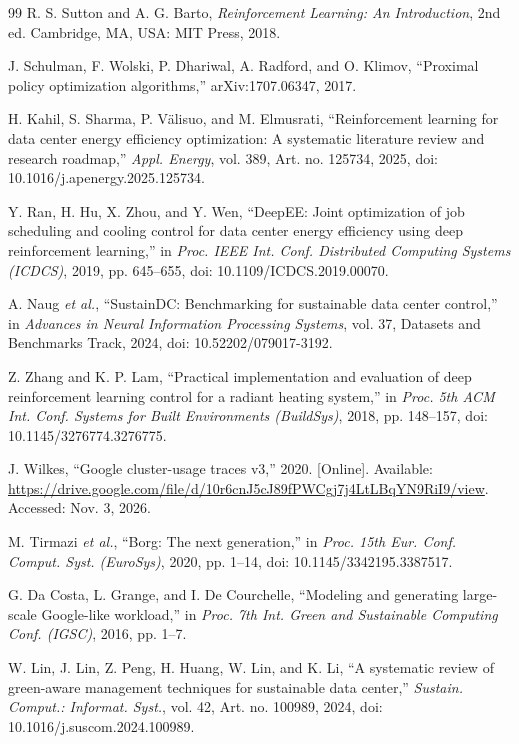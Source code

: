 \documentclass{UNCC-thesis}
\begin{document}
\begin{thebibliography}{99}
R. S. Sutton and A. G. Barto, \emph{Reinforcement Learning: An Introduction},
2nd ed. Cambridge, MA, USA: MIT Press, 2018.

J. Schulman, F. Wolski, P. Dhariwal, A. Radford, and O. Klimov, ``Proximal
policy optimization algorithms,'' arXiv:1707.06347, 2017.

H. Kahil, S. Sharma, P. V\"{a}lisuo, and M. Elmusrati, ``Reinforcement
learning for data center energy efficiency optimization: A systematic
literature review and research roadmap,'' \emph{Appl. Energy}, vol. 389,
Art. no. 125734, 2025, doi: 10.1016/j.apenergy.2025.125734.

Y. Ran, H. Hu, X. Zhou, and Y. Wen, ``DeepEE: Joint optimization of job
scheduling and cooling control for data center energy efficiency using deep
reinforcement learning,'' in \emph{Proc. IEEE Int. Conf. Distributed
Computing Systems (ICDCS)}, 2019, pp. 645--655,
doi: 10.1109/ICDCS.2019.00070.

A. Naug \emph{et al.}, ``SustainDC: Benchmarking for sustainable data center
control,'' in \emph{Advances in Neural Information Processing Systems},
vol. 37, Datasets and Benchmarks Track, 2024,
doi: 10.52202/079017-3192.

Z. Zhang and K. P. Lam, ``Practical implementation and evaluation of deep
reinforcement learning control for a radiant heating system,'' in
\emph{Proc. 5th ACM Int. Conf. Systems for Built Environments (BuildSys)},
2018, pp. 148--157, doi: 10.1145/3276774.3276775.

J. Wilkes, ``Google cluster-usage traces v3,'' 2020. [Online]. Available:
\url{https://drive.google.com/file/d/10r6cnJ5cJ89fPWCgj7j4LtLBqYN9RiI9/view}.
Accessed: Nov. 3, 2026.

M. Tirmazi \emph{et al.}, ``Borg: The next generation,'' in
\emph{Proc. 15th Eur. Conf. Comput. Syst. (EuroSys)}, 2020, pp. 1--14,
doi: 10.1145/3342195.3387517.

G. Da Costa, L. Grange, and I. De Courchelle, ``Modeling and generating
large-scale Google-like workload,'' in \emph{Proc. 7th Int. Green and
Sustainable Computing Conf. (IGSC)}, 2016, pp. 1--7.

W. Lin, J. Lin, Z. Peng, H. Huang, W. Lin, and K. Li, ``A systematic review
of green-aware management techniques for sustainable data center,''
\emph{Sustain. Comput.: Informat. Syst.}, vol. 42, Art. no. 100989, 2024,
doi: 10.1016/j.suscom.2024.100989.


\end{thebibliography}
\end{document}
